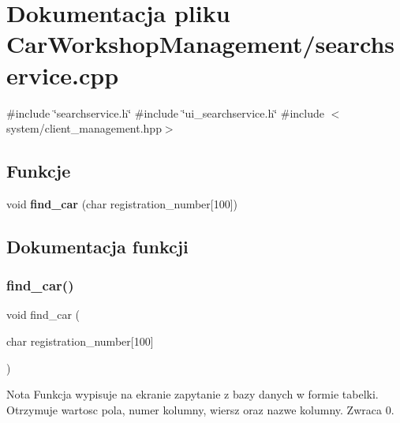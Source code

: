 \section{Dokumentacja pliku Car\+Workshop\+Management/searchservice.cpp}
\label{searchservice_8cpp}
{\ttfamily \#include \char`\"{}searchservice.\+h\char`\"{}}\newline
{\ttfamily \#include \char`\"{}ui\+\_\+searchservice.\+h\char`\"{}}\newline
{\ttfamily \#include $<$system/client\+\_\+management.\+hpp$>$}\newline
\subsection*{Funkcje}
\begin{DoxyCompactItemize}
\item 
void \textbf{ find\+\_\+car} (char registration\+\_\+number[100])
\end{DoxyCompactItemize}


\subsection{Dokumentacja funkcji}
\mbox{\label{searchservice_8cpp_afcc85d031f9b558083d8caf183b388b4}} 
\subsubsection{find\_car()}
{\footnotesize\ttfamily void find\+\_\+car (\begin{DoxyParamCaption}\item[{char}]{registration\+\_\+number[100] }\end{DoxyParamCaption})}


\begin{DoxyCode}{0}
\end{DoxyCode}
 \begin{DoxyNote}{Nota}
Funkcja wypisuje na ekranie zapytanie z bazy danych w formie tabelki. Otrzymuje wartosc pola, numer kolumny, wiersz oraz nazwe kolumny. Zwraca 0. 
\end{DoxyNote}

